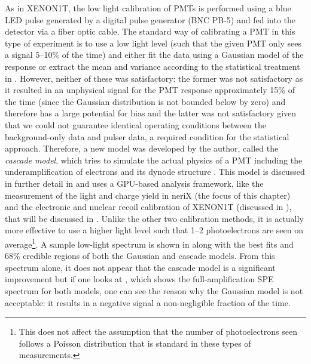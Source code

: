 As in XENON1T, the low light calibration of PMTs is performed using a blue LED pulse generated by a digital pulse generator (BNC PB-5) and fed into the detector via a fiber optic cable.  The standard way of calibrating a PMT in this type of experiment is to use a low light level (such that the given PMT only sees a signal 5--10\% of the time) and either fit the data using a Gaussian model of the response or extract the mean and variance according to the statistical treatment in .  However, neither of these was satisfactory: the former was not satisfactory as it resulted in an unphysical signal for the PMT response approximately 15\% of the time (since the Gaussian distribution is not bounded below by zero) and therefore has a large potential for bias and the latter was not satisfactory given that we could not guarantee identical operating conditions between the background-only data and pulser data, a required condition for the statistical approach.  Therefore, a new model was developed by the author, called the \textit{cascade model}, which tries to simulate the actual physics of a PMT including the underamplification of electrons and its dynode structure \cite{anthony2017characterization}.  This model is discussed in further detail in  and uses a GPU-based analysis framework, like the measurement of the light and charge yield in neriX (the focus of this chapter) and the electronic and nuclear recoil calibration of XENON1T (discussed in ), that will be discussed in .  Unlike the other two calibration methods, it is actually more effective to use a higher light level such that 1--2 photoelectrons are seen on average\footnote{This does not affect the assumption that the number of photoelectrons seen follows a Poisson distribution that is standard in these types of measurements.}.  A sample low-light spectrum is shown in  along with the best fits and 68\% credible regions of both the Gaussian and cascade models.  From this spectrum alone, it does not appear that the cascade model is a significant improvement but if one looks at , which shows the full-amplification SPE spectrum for both models, one can see the reason why the Gaussian model is not acceptable: it results in a negative signal a non-negligible fraction of the time.


